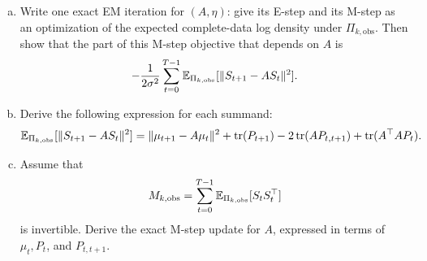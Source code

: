 \begin{exercisechunk}
\begin{enumerate}[(a),beginpenalty=10000]
\item Write one exact EM iteration for \((A,\eta)\): give its E-step and its
M-step as an optimization of the expected complete-data log density under
\(\Pi_{k,\mathrm{obs}}\). Then show that the part of this M-step objective
that depends on \(A\) is
\[
 -\frac{1}{2\sigma^2}\sum_{t=0}^{T-1}
   \mathbb E_{\Pi_{k,\mathrm{obs}}}[\|S_{t+1}-AS_t\|^2].
\]
\item Derive the following expression for each summand:
\[
 \mathbb E_{\Pi_{k,\mathrm{obs}}}[\|S_{t+1}-AS_t\|^2]
 =\|\mu_{t+1}-A\mu_t\|^2+\operatorname{tr}(P_{t+1})
  -2\operatorname{tr}(A P_{t,t+1})
  +\operatorname{tr}(A^\top A P_t).
\]
\item Assume that
\[
 M_{k,\mathrm{obs}}
 =\sum_{t=0}^{T-1}\mathbb E_{\Pi_{k,\mathrm{obs}}}[S_tS_t^\top]
\]
is invertible. Derive the exact M-step update for \(A\), expressed in
terms of \(\mu_t,P_t\), and \(P_{t,t+1}\).
\end{enumerate}
\end{exercisechunk}
